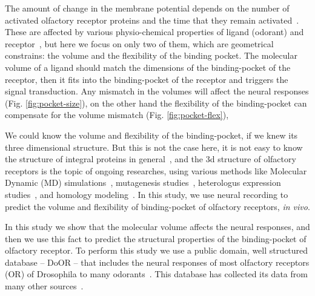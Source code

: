 \documentclass[11pt]{paper} %
\begin{document}
The amount of change in the membrane potential depends on the number of activated olfactory receptor proteins and the time that they remain activated~\cite{}.
These are affected by various physio-chemical properties of ligand (odorant) and receptor~\cite{}, 
but here we focus on only two of them, which are geometrical constrains: the volume and the flexibility of the binding pocket.
The molecular volume of a ligand should match the dimensions of the binding-pocket of the receptor,
then it fits into the binding-pocket of the receptor and triggers the signal transduction. 
Any mismatch in the volumes will affect the neural responses (Fig. \ref{fig:pocket-size}), 
on the other hand the flexibility of the binding-pocket can compensate for the volume mismatch (Fig. \ref{fig:pocket-flex}),

We could know the volume and flexibility of the binding-pocket, if we knew its three dimensional structure.
But this is not the case here, it is not easy to know the structure of integral proteins in general~\cite{}, 
and the 3d structure of olfactory receptors is the topic of ongoing researches, 
using various methods like Molecular Dynamic (MD) simulations~\cite{Khafizov2007,Lupieri2009}, 
mutagenesis studies~\cite{}, heterologus expression studies~\cite{}, and homology modeling~\cite{}.
In this study, we use neural recording to predict the volume and flexibility of binding-pocket of olfactory receptors, {\it in vivo}.

In this study we show that the molecular volume affects the neural responses, 
and then we use this fact to predict the structural properties of the binding-pocket of olfactory receptor.
To perform this study we use a public domain, well structured database -- DoOR -- 
that includes the neural responses of most olfactory receptors (OR) of Drosophila to many odorants~\cite{Galizia2010}. 
This database has collected its data from many other sources~\cite{Bruyne1999,Bruyne2001,Dobritsa2003,Goldman2005,Hallem2004,Hallem2006,
Kreher2005,Kreher2008,Kwon2007,Pelz2006,Pelz2006,Schmuker2007,Stensmyr2003,
Turner2009,VanderGoesvanNaters2007,Yao2005}.



\end{document}

